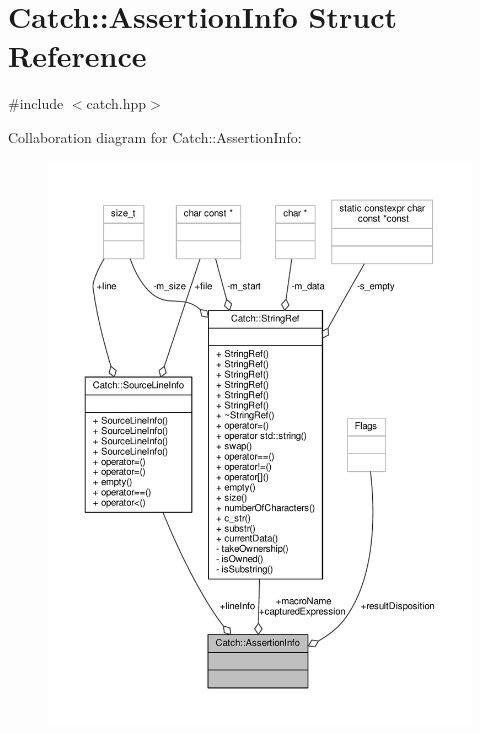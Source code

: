 \hypertarget{struct_catch_1_1_assertion_info}{\section{Catch\-:\-:Assertion\-Info Struct Reference}
\label{struct_catch_1_1_assertion_info}
}


{\ttfamily \#include $<$catch.\-hpp$>$}



Collaboration diagram for Catch\-:\-:Assertion\-Info\-:
\nopagebreak
\begin{figure}[H]
\begin{center}
\leavevmode
\includegraphics[width=350pt]{struct_catch_1_1_assertion_info__coll__graph}
\end{center}
\end{figure}
